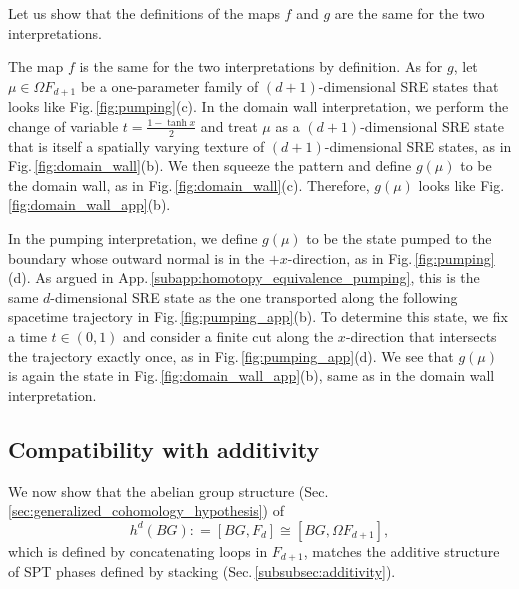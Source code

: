 \documentclass[sort&compress]{elsarticle}
\theoremstyle{theoremstyle}
\theoremstyle{framedtheoremstyle}
\theoremstyle{definitionstyle}
\theoremstyle{definitionstyle}
\theoremstyle{definitionstyle}
\theoremstyle{definitionstyle}
\theoremstyle{nameddefinitionstyle}
\theoremstyle{framednameddefinitionstyle}
\theoremstyle{proofstyle}
\theoremstyle{definitionstyle}
\newcommand{\coloneq}{\mathrel{\mathop:}=}
\newcommand{\isomorphic}{\cong}
\newcommand{\brackets}[1]{\left[ #1 \right]}
\begin{document}
\begin{appendices}
Let us show that the definitions of the maps $f$ and $g$ are the same for the two interpretations. 

The map $f$ is the same for the two interpretations by definition. As for $g$, let $\mu \in \Omega F_{d+1}$ be a one-parameter family of $(d+1)$-dimensional SRE states that looks like Fig.\,\ref{fig:pumping}(c).
In the domain wall interpretation, we perform the change of variable $t = \frac{1 - \tanh x}{2}$ and treat $\mu$ as a $(d+1)$-dimensional SRE state that is itself a spatially varying texture of $(d+1)$-dimensional SRE states, as in Fig.\,\ref{fig:domain_wall}(b).
We then squeeze the pattern and define $g(\mu)$ to be the domain wall, as in Fig.\,\ref{fig:domain_wall}(c). Therefore, $g(\mu)$ looks like Fig.\,\ref{fig:domain_wall_app}(b).

In the pumping interpretation, we define $g(\mu)$ to be the state pumped to the boundary whose outward normal is in the $+x$-direction, as in Fig.\,\ref{fig:pumping}(d). As argued in App.\,\ref{subapp:homotopy_equivalence_pumping}, this is the same $d$-dimensional SRE state as the one transported along the following spacetime trajectory in Fig.\,\ref{fig:pumping_app}(b).
To determine this state, we fix a time $t\in (0,1)$ and consider a finite cut along the $x$-direction that intersects the trajectory exactly once, as in Fig.\,\ref{fig:pumping_app}(d).
We see that $g(\mu)$ is again the state in Fig.\,\ref{fig:domain_wall_app}(b), same as in the domain wall interpretation.

\subsection{Compatibility with additivity\label{subapp:homotopy_equivalence_compatibility}}

We now show that the abelian group structure (Sec.\,\ref{sec:generalized_cohomology_hypothesis}) of
\begin{equation}
h^d(BG) \coloneq \brackets{ BG, F_d } \isomorphic \brackets{BG, \Omega F_{d+1}}, \label{coh}
\end{equation}
which is defined by concatenating loops in $F_{d+1}$, matches the additive structure of SPT phases defined by stacking (Sec.\,\ref{subsubsec:additivity}).


\end{appendices}
\end{document}
